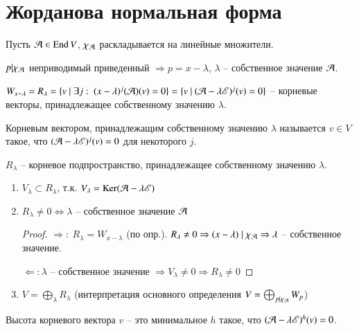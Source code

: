 \documentclass[main]{subfiles}
\begin{document}
\chapter{Жорданова нормальная форма}

Пусть $\mathcal{A} \in \operatorname{End} V$, $\chi_{\mathcal{A}}$ раскладывается на линейные множители.

$p| \chi_{\mathcal{A}}$ неприводимый приведенный $\Rightarrow p = x - \lambda$, $\lambda$ -- собственное значение $\mathcal{A}$.

$W_{x-\lambda} = R_{\lambda} = \{v \ | \ \exists j: \ (x-\lambda)^j (\mca) (v) = 0\} =
  \{v \ | \ (\mca - \lambda \mse )^j (v) = 0\}$ -- корневые векторы, принадлежащее собственному значению $\lambda$.

\begin{definition} 
  Корневым вектором, принадлежащим собственному значению $\lambda$ называется $v \in V$ такое, что $(\mathcal{A} - \lambda \mathscr{E})^j (v) = 0$ для некоторого $j$.

  $R_{\lambda}$ -- корневое подпространство, принадлежащее собственному значению $\lambda$.
\end{definition}

\begin{propertylist}
  \begin{enumerate}
    \item $V_{\lambda} \subset R_{\lambda}$, т.к. $V_{\lambda} = \operatorname{Ker}(\mathcal{A} - \lambda \mathscr{E})$
    \item $R_{\lambda} \neq 0 \Leftrightarrow \lambda$ -- собственное значение $\mathcal{A}$
          \begin{proof}
            $\Rightarrow: \ R_{\lambda} = W_{x-\lambda}$ (по опр.). $R_{\lambda} \neq 0 \Rightarrow
              (x - \lambda) \mid \chi_{\mathcal{A}} \Rightarrow \lambda$ -- собственное значение.

            $\Leftarrow: \lambda$ -- собственное значение $\Rightarrow V_{\lambda} \neq 0 \Rightarrow R_{\lambda} \neq 0$
          \end{proof}
    \item $V = \bigoplus_{\lambda} R_{\lambda}$ (интерпретация основного определения $V = \bigoplus_{p | \chi_{\mathcal{A}}} W_p$)
  \end{enumerate}
\end{propertylist}

\begin{definition} 
  Высота корневого вектора $v$ -- это минимальное $h$ такое, что $(\mathcal{A} - \lambda \mathscr{E})^h (v) = 0$.
\end{definition}
\end{document}
